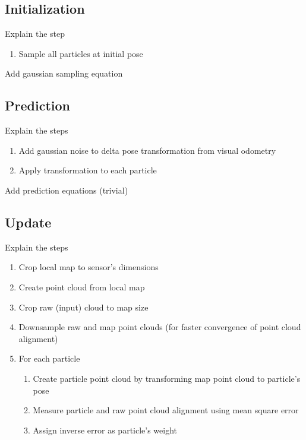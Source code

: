 \subsection{Initialization}

Explain the step

\begin{enumerate}
    \item Sample all particles at initial pose
\end{enumerate}

\noindent
Add gaussian sampling equation

\subsection{Prediction}

Explain the steps

\begin{enumerate}
    \item Add gaussian noise to delta pose transformation from visual odometry
    \item Apply transformation to each particle
\end{enumerate}

\noindent
Add prediction equations (trivial)

\subsection{Update}

Explain the steps

\begin{enumerate}
    \item Crop local map to sensor's dimensions
    \item Create point cloud from local map
    \item Crop raw (input) cloud to map size
    \item Downsample raw and map point clouds (for faster convergence of point cloud alignment)
    \item For each particle
        \begin{enumerate}
            \item Create particle point cloud by transforming map point cloud to particle's pose
            \item Measure particle and raw point cloud alignment using mean square error
            \item Assign inverse error as particle's weight
        \end{enumerate}
\end{enumerate}

